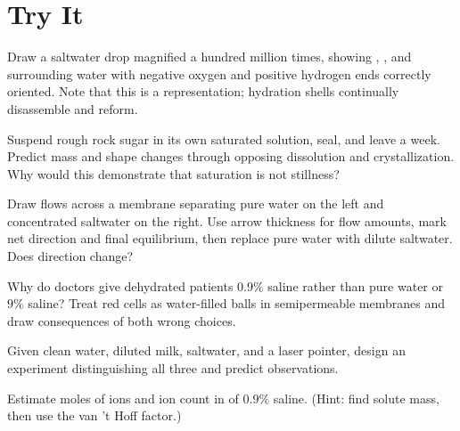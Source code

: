 \section*{Try It}

\begin{sikaoti}
\item Draw a saltwater drop magnified a hundred million times, showing , , and surrounding water with negative oxygen and positive hydrogen ends correctly oriented. Note that this is a representation; hydration shells continually disassemble and reform.
\item Suspend rough rock sugar in its own saturated solution, seal, and leave a week. Predict mass and shape changes through opposing dissolution and crystallization. Why would this demonstrate that saturation is not stillness?
\item Draw flows across a membrane separating pure water on the left and concentrated saltwater on the right. Use arrow thickness for flow amounts, mark net direction and final equilibrium, then replace pure water with dilute saltwater. Does direction change?
\item Why do doctors give dehydrated patients $0.9\%$ saline rather than pure water or $9\%$ saline? Treat red cells as water-filled balls in semipermeable membranes and draw consequences of both wrong choices.
\item Given clean water, diluted milk, saltwater, and a laser pointer, design an experiment distinguishing all three and predict observations.
\item Estimate moles of ions and ion count in  of $0.9\%$ saline. (Hint: find solute mass, then use the van 't Hoff factor.)
\end{sikaoti}
